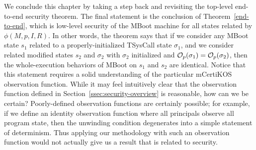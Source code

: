 We conclude this chapter by taking a step back and revisiting the
top-level end-to-end security theorem. The final 
statement is the conclusion of Theorem~\ref{end-to-end}, which
is low-level security of the MBoot machine for all states
related by $\phi(M,p,I,R)$. In other words, the theorem says
that if we consider any MBoot state $s_1$ related to a
properly-initialized TSysCall state $\sigma_1$, and
we consider related modified states $s_2$ and $\sigma_2$
with $\sigma_2$ initialized and $\mathcal{O}_{p}(\sigma_1) = \mathcal{O}_{p}(\sigma_2)$, 
then the whole-execution behaviors of MBoot on $s_1$ and $s_2$
are identical. Notice that this statement requires a solid 
understanding of the particular mCertiKOS observation function. 
While it may feel intuitively clear that the observation function
defined in Section~\ref{ssec:security-overview} is reasonable,
how can we be certain? Poorly-defined observation functions are
certainly possible; for example, if we define an identity observation
function where all principals observe all program state, then 
the unwinding condition degenerates
into a simple statement of determinism. Thus applying our methodology
with such an observation function would not actually give us a result 
that is related to security.

